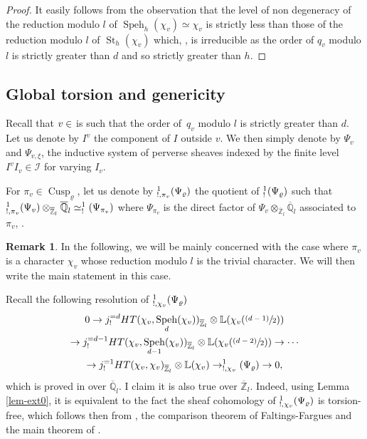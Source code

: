 \documentclass[JEP,XML,SOM,Unicode,published]{cedram}
\newcommand{\NoChangel}[1]{%
\expandafter\let\csname old\string#1\endcsname=#1
\let#1=\relax
\newcommand{#1}{\mathcode`l="716C\csname old\string#1\endcsname\mathcode`l="7160 }%
}
\newcommand{\psfrac}[2]{\sfrac{(#1)}{#2}}
\theoremstyle{plain}
\theoremstyle{definition}
\newtheorem*{remark}{Remark}
\numberwithin{equation}{subsection}
\newcommand\Qm{{\mathbb Q}}
\newcommand\Zm{{\mathbb Z}}
\newcommand\Lm{{\mathbb L}}
\newcommand\IC{{\mathcal I}}
\DeclareMathOperator{\cusp}{Cusp}
\DeclareMathOperator{\speh}{Speh}
\DeclareMathOperator{\st}{St}
\DeclareMathOperator{\spl}{Spl}\NoChangel{\spl}
\DeclareMathOperator{\Fil}{Fil}\NoChangel{\Fil}
\begin{document}
\begin{proof}
It easily follows from the observation that the level of non degeneracy of
the reduction modulo $l$ of $\speh_h(\chi_v) \simeq \chi_v$ is strictly less than
those of the reduction modulo $l$ of $\st_h(\chi_v)$ which, \cf \cite{boyer-repmodl},
is irreducible as the order
of $q_v$ modulo $l$ is strictly greater than $d$ and so strictly greater than $h$.
\end{proof}

\subsection{Global torsion and genericity}
\label{para-generic}

Recall that $v \in \spl$ is such that the order of~$q_v$ modulo $l$ is strictly
greater than $d$. Let us denote by $I^{v}$ the component of $I$ outside $v$.
We then simply denote by $\Psi_v$ and $\Psi_{v,\xi}$,
the inductive system of perverse sheaves indexed by the finite level $I^{v} I_v \in \IC$
for varying $I_v$.

For $\pi_{v} \in \cusp_\varrho$, let us denote by $\Fil^1_{!,\pi_{v}}(\Psi_\varrho)$ the quotient of $\Fil^1_!(\Psi_\varrho)$ such that
$\Fil^1_{!,\pi_{v}}(\Psi_v) \otimes_{\overline \Zm_l} \overline \Qm_l \simeq \Fil^1_!(\Psi_{\pi_{v}})$
where $\Psi_{\pi_{v}}$ is the direct factor of $\Psi_v \otimes_{\overline \Zm_l} \overline \Qm_l$
associated to $\pi_{v}$, \cf \cite{boyer-torsion}.

\begin{remark}
In the following, we will be mainly concerned with the case where $\pi_v$
is a character $\chi_v$ whose reduction modulo $l$ is the trivial character.
We will then write the main statement in this case.
\end{remark}

Recall the following resolution of $\Fil^1_{!,\chi_{v}}(\Psi_\varrho)$
\begin{multline} \label{eq-resolution-psi0}
0 \to j^{=d}_! HT(\chi_{v},\speh_d(\chi_{v}))_{\overline \Zm_l} \otimes \Lm (\chi_{v}(\psfrac{d-1}{2}))\\
\to j^{=d-1}_!HT(\chi_{v},\speh_{d-1}(\chi_{v}))_{\overline \Zm_l} \otimes \Lm (\chi_{v}(\psfrac{d-2}{2}))
\to \cdots \\ \to j^{=1}_! HT(\chi_{v},\chi_{v})_{\overline \Zm_l} \otimes \Lm(\chi_{v})
\to \Fil^1_{!,\chi_{v}}(\Psi_\varrho) \to 0,
\end{multline}
which is proved in \cite{boyer-torsion} over $\overline \Qm_l$. I claim it is
also true over $\overline \Zm_l$. Indeed, using Lemma \ref{lem-ext0},
it is equivalent to the fact the sheaf cohomology of $\Fil^1_{!,\chi_{v}}(\Psi_\varrho)$
is torsion-free, which follows then from \cite{s-s}, the comparison
theorem of Faltings-Fargues \cf \cite{fargues-faltings} and the main theorem
of \cite{fargues-monodromie}.
\end{document}

